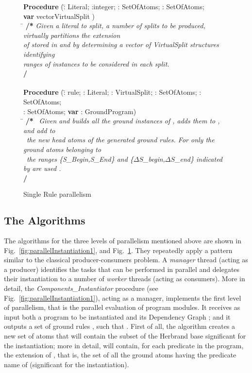\documentclass[preprint]{tlp}
\newcommand{\DNF}{\ensuremath{\Delta S}\xspace}
\begin{document}
\begin{figure}[th!]
\begin{center}
\begin{small}
\begin{tabbing}
{\bf Procedure} (\= : Literal; :integer; : SetOfAtoms; : SetOfAtoms; \\
\> {\bf var} vectorVirtualSplit )\\
\hspace*{0.2cm} \= \kill
{\bf /*}
\>  {\em Given a literal  to split, a number  of splits to be produced, virtually partitions the extension}\\
\> { \em  of  stored in  and  by determining a vector  of VirtualSplit structures identifying} \\
\>  {\em  ranges of instances to be considered in each split. }\\
{\bf */}
\\ \
\\
{\bf Procedure} (\= : rule; : Literal; : VirtualSplit; : SetOfAtoms; : SetOfAtoms;\\
\>{\bf var} : SetOfAtoms; {\bf var} : GroundProgram)\\
\hspace*{0.2cm} \= \kill
{\bf /*}
\  {\em Given  and  builds all the ground instances of , adds them to , and add to  } \\
\> \ {\em  the new head atoms of the generated ground rules. For  only the ground atoms belonging to }\\
\> \ {\em the ranges \{S\_Begin,S\_End\} and \{\DNF\_begin,\DNF\_end\} indicated by  are used  .}\\
{\bf */}
\end{tabbing}

\end{small}
\caption{Single Rule  parallelism}\label{fig:parallelInstantiation2}
\end{center}
\end{figure}



\subsection{The Algorithms}

The algorithms for the three levels of parallelism mentioned above are
shown in Fig.~\ref{fig:parallelInstantiation1}, and Fig.~\ref{fig:parallelInstantiation2}.
They repeatedly apply a pattern similar to the classical producer-consumers problem. A
\textit{manager} thread (acting as a producer) identifies the
tasks that can be performed in parallel  and delegates their instantiation to a number
of \textit{worker} threads (acting as consumers).
More in detail, the {\em Components\_Instantiator} procedure (see Fig.~\ref{fig:parallelInstantiation1}),  acting as a manager,
implements the first level of parallelism, that is the parallel evaluation of program modules.
It receives as input both a
program  to be instantiated and its Dependency Graph ; and it
outputs a set of ground rules , such that .
First of all, the algorithm creates a new set  of atoms that will
contain the subset of the Herbrand base significant for the
instantiation; more in detail,  will contain, for each predicate  in the program,
the extension of , that is, the set of all the ground atoms having the predicate name of 
 (significant for the instantiation).
\end{document}
